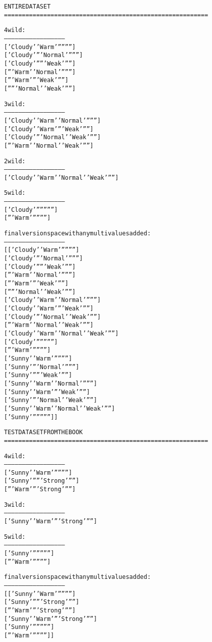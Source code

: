 \begin{multicols}{2}
\begin{shaded}
\scriptsize
\begin{alltt}
ENTIRE DATASET
=========================================================

 4 wild :
--------------------------------------------------
['Cloudy' 'Warm' '' '' '' '']
['Cloudy' '' 'Normal' '' '' '']
['Cloudy' '' '' 'Weak' '' '']
['' 'Warm' 'Normal' '' '' '']
['' 'Warm' '' 'Weak' '' '']
['' '' 'Normal' 'Weak' '' '']

 3 wild :
--------------------------------------------------
['Cloudy' 'Warm' 'Normal' '' '' '']
['Cloudy' 'Warm' '' 'Weak' '' '']
['Cloudy' '' 'Normal' 'Weak' '' '']
['' 'Warm' 'Normal' 'Weak' '' '']

 2 wild :
--------------------------------------------------
['Cloudy' 'Warm' 'Normal' 'Weak' '' '']

 5 wild :
--------------------------------------------------
['Cloudy' '' '' '' '' '']
['' 'Warm' '' '' '' '']


 final version space with any multivalues added :
--------------------------------------------------
[['Cloudy' 'Warm' '' '' '' '']
 ['Cloudy' '' 'Normal' '' '' '']
 ['Cloudy' '' '' 'Weak' '' '']
 ['' 'Warm' 'Normal' '' '' '']
 ['' 'Warm' '' 'Weak' '' '']
 ['' '' 'Normal' 'Weak' '' '']
 ['Cloudy' 'Warm' 'Normal' '' '' '']
 ['Cloudy' 'Warm' '' 'Weak' '' '']
 ['Cloudy' '' 'Normal' 'Weak' '' '']
 ['' 'Warm' 'Normal' 'Weak' '' '']
 ['Cloudy' 'Warm' 'Normal' 'Weak' '' '']
 ['Cloudy' '' '' '' '' '']
 ['' 'Warm' '' '' '' '']
 ['Sunny' 'Warm' '' '' '' '']
 ['Sunny' '' 'Normal' '' '' '']
 ['Sunny' '' '' 'Weak' '' '']
 ['Sunny' 'Warm' 'Normal' '' '' '']
 ['Sunny' 'Warm' '' 'Weak' '' '']
 ['Sunny' '' 'Normal' 'Weak' '' '']
 ['Sunny' 'Warm' 'Normal' 'Weak' '' '']
 ['Sunny' '' '' '' '' '']]
\end{alltt}
\small
\end{shaded}

\begin{shaded}
\scriptsize
\begin{alltt}
TEST DATASET FROM THE BOOK
=========================================================

 4 wild :
--------------------------------------------------
['Sunny' 'Warm' '' '' '' '']
['Sunny' '' '' 'Strong' '' '']
['' 'Warm' '' 'Strong' '' '']

 3 wild :
--------------------------------------------------
['Sunny' 'Warm' '' 'Strong' '' '']

 5 wild :
--------------------------------------------------
['Sunny' '' '' '' '' '']
['' 'Warm' '' '' '' '']


 final version space with any multivalues added :
--------------------------------------------------
[['Sunny' 'Warm' '' '' '' '']
 ['Sunny' '' '' 'Strong' '' '']
 ['' 'Warm' '' 'Strong' '' '']
 ['Sunny' 'Warm' '' 'Strong' '' '']
 ['Sunny' '' '' '' '' '']
 ['' 'Warm' '' '' '' '']]
\end{alltt}
\small
\end{shaded}
\end{multicols}

